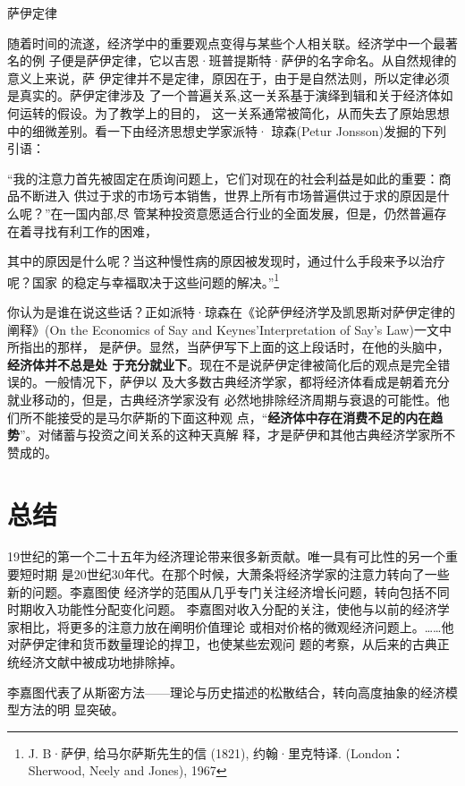 \begin{mybox}{萨伊定律}
  \begin{multicols}{2}

  随着时间的流遂，经济学中的重要观点变得与某些个人相关联。经济学中一个最著名的例
  子便是萨伊定律，它以吉恩·班普提斯特·萨伊的名字命名。从自然规律的意义上来说，萨
  伊定律并不是定律，原因在于，由于是自然法则，所以定律必须是真实的。萨伊定律涉及
  了一个普遍关系,这一关系基于演绎到辑和关于经济体如何运转的假设。为了教学上的目的，
  这一关系通常被简化，从而失去了原始思想中的细微差别。看一下由经济思想史学家派特·
  琼森(Petur Jonsson)发掘的下列引语：

  “我的注意力首先被固定在质询问题上，它们对现在的社会利益是如此的重要：商品不断进入
  供过于求的市场亏本销售，世界上所有市场普遍供过于求的原因是什么呢？”在一国内部,尽
  管某种投资意愿适合行业的全面发展，但是，仍然普遍存在着寻找有利工作的困难，

  其中的原因是什么呢？当这种慢性病的原因被发现时，通过什么手段来予以治疗呢？国家
  的稳定与幸福取决于这些问题的解决。”\footnote{J. B·萨伊, 给马尔萨斯先生的信
    (1821), 约翰·里克特译. (London：Sherwood, Neely and Jones), 1967}

你认为是谁在说这些话？正如派特·琼森在《论萨伊经济学及凯恩斯对萨伊定律的阐释》(On
the Economics of Say and Keynes’Interpretation of Say’s Law)一文中所指出的那样，
是萨伊。显然，当萨伊写下上面的这上段话时，在他的头脑中，\textbf{经济体并不总是处
  于充分就业下}。现在不是说萨伊定律被简化后的观点是完全错误的。一般情况下，萨伊以
及大多数古典经济学家，都将经济体看成是朝着充分就业移动的，但是，古典经济学家没有
必然地排除经济周期与衰退的可能性。他们所不能接受的是马尔萨斯的下面这种观
点，“\textbf{经济体中存在消费不足的内在趋势}”。对储蓄与投资之间关系的这种天真解
释，才是萨伊和其他古典经济学家所不赞成的。
  \end{multicols}
\end{mybox}

\section{总结}

19世纪的第一个二十五年为经济理论带来很多新贡献。唯一具有可比性的另一个重要短时期
是20世纪30年代。在那个时候，大萧条将经济学家的注意力转向了一些新的问题。李嘉图使
经济学的范围从几乎专门关注经济增长问题，转向包括不同时期收入功能性分配变化问题。
李嘉图对收入分配的关注，使他与以前的经济学家相比，将更多的注意力放在阐明价值理论
或相对价格的微观经济问题上。……他对萨伊定律和货币数量理论的捍卫，也使某些宏观问
题的考察，从后来的古典正统经济文献中被成功地排除掉。

李嘉图代表了从斯密方法——理论与历史描述的松散结合，转向高度抽象的经济模型方法的明
显突破。


